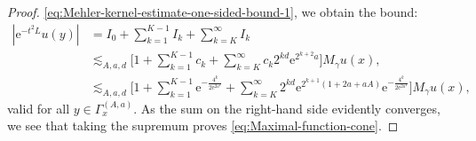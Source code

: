 \documentclass[preprint,12pt]{elsarticle}
\theoremstyle{remark}
\newcommand{\e}{\mathrm{e}} %
\begin{document}
\begin{proof}
  \eqref{eq:Mehler-kernel-estimate-one-sided-bound-1}, we obtain the bound:
  \begin{align*}
    |\e^{-t^2 L} u(y)| &= I_0 + \sum_{k = 1}^{K - 1} I_k + \sum_{k = K}^\infty I_k\\
    &\lesssim_{A, a, d} \biggl[1 + \sum_{k =  1}^{K - 1} c_k +  \sum_{k =  K}^\infty c_k
      2^{k d} \e^{2^{k + 2}a} \biggr] M_\gamma u(x),\\
    &\lesssim_{A, a, d} \biggl[1 + \sum_{k =  1}^{K - 1} \e^{-\frac{4^k}{2 \e^{2 a^2}}} + \sum_{k = K}^\infty 2^{k d} \e^{2^{k + 1} (1 + 2a + aA)} \e^{-\frac{4^k}{2 \e^{2 a^2}}} \biggr] M_\gamma u(x),
  \end{align*}
  valid for all $y \in \Gamma_x^{(A, a)}$. As the sum on the right-hand side
  evidently converges, we see that taking the supremum proves
  \eqref{eq:Maximal-function-cone}.
\end{proof}


\end{document}

